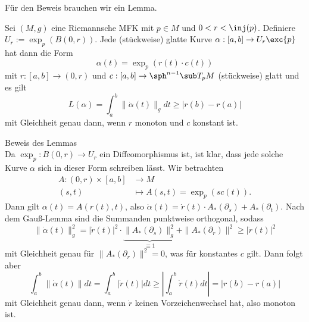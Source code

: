 Für den Beweis brauchen wir ein Lemma.
\begin{lemma}{}{}
Sei $(M,g)$ eine Riemannsche MFK mit $p \in M$ und $0 < r < \inj(p)$. Definiere $U_r := \exp_p (B(0,r))$. Jede (stückweise) glatte Kurve $\alpha: [a,b] \to U_r \exc \{p \}$ hat dann die Form
\begin{equation}
\alpha(t) = \exp_p (r(t) \cdot c(t))
\end{equation}
mit $r: [a,b] \to (0,r)$ und $c: [a,b] \to \sph^{n-1} \sub T_pM$ (stückweise) glatt und es gilt
\begin{equation}
L(\alpha) = \int_a^b \| \dot{\alpha} (t) \|_g dt \geq |r(b)-r(a)|
\end{equation}
mit Gleichheit genau dann, wenn $r$ monoton und $c$ konstant ist.
\end{lemma}
\begin{beweis} Beweis des Lemmas\\
Da $\exp_p: B(0,r) \to U_r$ ein Diffeomorphismus ist, ist klar, dass jede solche Kurve $\alpha$ sich in dieser Form schreiben lässt. Wir betrachten 
\begin{align}
A: (0,r) \times [a,b] &\to M \\
(s,t) &\mapsto A(s,t)=\exp_p(sc(t)).
\end{align}
Dann gilt $\alpha(t) = A(r(t), t)$, also $\dot{\alpha}(t) = \dot{r}(t) \cdot A_\ast(\partial_s) + A_\ast (\partial_t)$. Nach dem Gauß-Lemma sind die Summanden punktweise orthogonal, sodass
\begin{equation}
\| \dot{\alpha} (t) \|^2_g = | \dot{r}(t)|^2 \cdot \underbrace{\| A_\ast (\partial_s) \|_g^2}_{\equiv 1} + \| A_\ast (\partial_r)\|^2 \geq |\dot{r}(t)|^2
\end{equation}
mit Gleichheit genau für $\| A_\ast (\partial_r)\|^2 = 0$, was für konstantes $c$ gilt. Dann folgt aber
\begin{equation}
\int_a^b \| \dot{\alpha} (t) \| dt = \int_a^b |\dot{r}(t)|dt \geq \left| \int_a^b \dot{r} (t) dt \right| = |r(b)-r(a)|
\end{equation}
mit Gleichheit genau dann, wenn $\dot{r}$ keinen Vorzeichenwechsel hat, also monoton ist.
\end{beweis}
